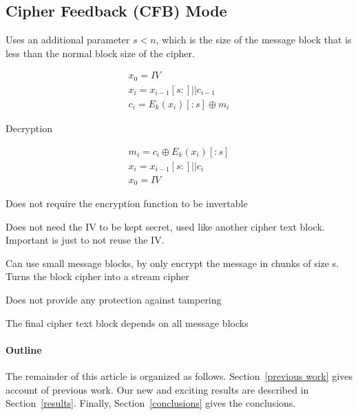 \documentclass[12pt]{article}
\begin{document}
\subsection*{Cipher Feedback (CFB) Mode}

Uses an additional parameter $s < n$, which is the size of the message block that is less than the normal block size of the cipher.

\begin{equation}
\begin{split}
x_0 = IV \\
x_i = x_{i-1}[s:]||c_{i-1} \\
c_i = E_k(x_i)[:s] \oplus m_i
\end{split}
\end{equation}

Decryption

\begin{equation}
\begin{split}
m_i = c_i \oplus E_k(x_i)[:s] \\
x_i = x_{i-1}[s:]||c_i \\
x_0 = IV
\end{split}
\end{equation}

\begin{list}{*}{
\setlength{\itemsep}{0pt}
\setlength{\parsep}{0pt}
\setlength{\topsep}{0pt}
\setlength{\partopsep}{0pt}
\setlength{\leftmargin}{2em}
\setlength{\labelwidth}{1.5em}
\setlength{\labelsep}{0.5em}
}
\item Does not require the encryption function to be invertable
\item Does not need the IV to be kept secret, used like another cipher text block. Important is just to not reuse the IV.
\item Can use small message blocks, by only encrypt the message in chunks of size s. Turns the block cipher into a stream cipher
\item Does not provide any protection against tampering
\item The final cipher text block depends on all message blocks
\end{list}

 
\paragraph{Outline}
The remainder of this article is organized as follows.
Section~\ref{previous work} gives account of previous work.
Our new and exciting results are described in Section~\ref{results}.
Finally, Section~\ref{conclusions} gives the conclusions.
\end{document}
